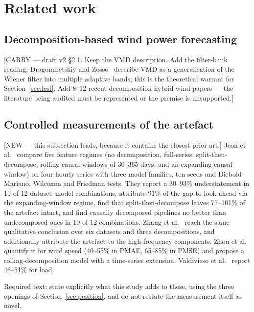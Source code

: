 \documentclass[review,3p,times]{elsarticle}
\newcommand{\carry}[1]{\textsf{\small [CARRY --- #1]}}
\begin{document}
\section{Related work}\label{sec:related}

\subsection{Decomposition-based wind power forecasting}
\carry{draft v2 §2.1. Keep the VMD description. Add the filter-bank reading:
Dragomiretskiy and Zosso~\cite{dragomiretskiy2014} describe VMD as a
generalisation of the Wiener filter into multiple adaptive bands; this is the
theoretical warrant for Section~\ref{sec:lcsf}. Add 8--12 recent
decomposition-hybrid wind papers --- the literature being audited must be
represented or the premise is unsupported.}

\subsection{Controlled measurements of the artefact}
\textsf{[NEW --- this subsection leads, because it contains the closest prior
art.]} Jeon et al.~\cite{jeon2026} compare five feature regimes (no
decomposition, full-series, split-then-decompose, rolling causal windows of
30--365 days, and an expanding causal window) on four hourly series with three
model families, ten seeds and Diebold--Mariano, Wilcoxon and Friedman tests.
They report a 30--93\% understatement in 11 of 12 dataset--model combinations,
attribute 91\% of the gap to look-ahead via the expanding-window regime, find
that split-then-decompose leaves 77--101\% of the artefact intact, and find
causally decomposed pipelines no better than undecomposed ones in 10 of 12
combinations. Zhang et al.~\cite{zhang2025} reach the same qualitative
conclusion over six datasets and three decompositions, and additionally
attribute the artefact to the high-frequency components.
Zhou et al.~\cite{zhou2024} quantify it for wind speed (40--55\% in PMAE,
65--85\% in PMSE) and propose a rolling-decomposition model with a time-series
extension. Valdivieso et al.~\cite{valdivieso2026} report 46--51\% for load.

\textsf{Required text:} state explicitly what this study adds to these, using
the three openings of Section~\ref{sec:position}, and do not restate the
measurement itself as novel.
\end{document}
